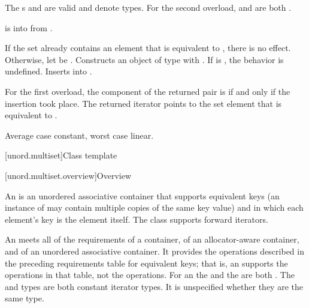 \begin{itemdescr}
\pnum
\constraints
The s  and
 are valid and denote types.
For the second overload,
 and
 are both .

\pnum
\expects
{} is 
into  from .

\pnum
\effects
If the set already contains an element that is equivalent to ,
there is no effect.
Otherwise, let  be .
Constructs an object  of type 
with .
If  is ,
the behavior is undefined.
Inserts  into .

\pnum
\returns
For the first overload,
the  component of the returned pair is 
if and only if the insertion took place.
The returned iterator points to the set element
that is equivalent to .

\pnum
\complexity
Average case constant, worst case linear.
\end{itemdescr}

[unord.multiset]{Class template }%

[unord.multiset.overview]{Overview}

\pnum
{}%
%
An  is an unordered associative container
that supports equivalent keys (an instance of  may contain
multiple copies of the same key value) and in which each element's key
is the element itself.
The  class
supports forward iterators.

\pnum
An  meets all of the requirements
of a container,
of an allocator-aware container, and
of an unordered associative container.
It provides the operations described in the
preceding requirements table for equivalent keys; that is, an 
supports the  operations in that table, not the  operations.
For an  the  and the  are
both . The  and  types are both
constant iterator types. It is unspecified whether they are the same type.

